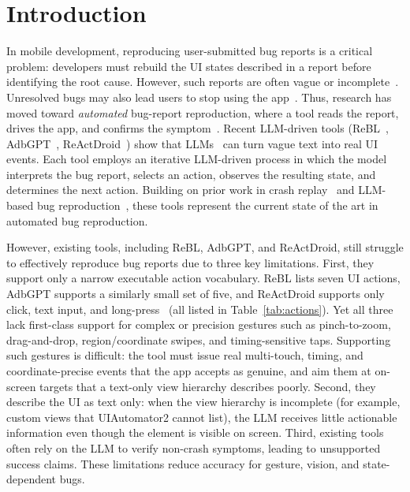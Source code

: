 \documentclass[10pt,conference,a4paper]{IEEEtran}
\begin{document}
  \section{Introduction}
  \label{sec:intro}

  In mobile development, reproducing user-submitted bug reports is a
  critical problem: developers must rebuild the UI states described in a
  report before identifying the root cause. However, such reports are
  often vague or incomplete~\cite{zimmermann,chaparro-s2r,rebl,adbgpt}.
  Unresolved bugs may also lead users to stop using the app~\cite{applause}.
  Thus, research has moved toward \emph{automated} bug-report
  reproduction, where a tool reads the report, drives the app, and
  confirms the symptom~\cite{recdroid,recdroidplus}. Recent LLM-driven tools (ReBL~\cite{rebl}, AdbGPT~\cite{adbgpt},
  ReActDroid~\cite{reactdroid}) show that LLMs~\cite{gpt4,gemini} can turn
  vague text into real UI events.
  Each tool employs an iterative LLM-driven process in which the model
  interprets the bug report, selects an action, observes the resulting
  state, and determines the next action. Building on prior work in
  crash replay~\cite{recdroid,recdroidplus,yakusu,crashtranslator,scopedroid}
  and LLM-based bug reproduction~\cite{libro}, these tools represent the
  current state of the art in automated bug reproduction. 

  However, existing tools, including ReBL, AdbGPT, and ReActDroid, still struggle to effectively reproduce bug reports due to three key limitations. First, they support only a narrow executable action vocabulary. ReBL lists seven
  UI actions, AdbGPT supports a similarly small set of five, and
  ReActDroid supports only click, text input, and long-press~\cite{rebl,adbgpt,reactdroid}
  (all listed in Table~\ref{tab:actions}). Yet all three lack first-class support for complex or precision gestures such as pinch-to-zoom, drag-and-drop,
  region/coordinate swipes, and timing-sensitive taps. Supporting such gestures is difficult: the tool must issue real multi-touch, timing, and coordinate-precise events that the app accepts as genuine, and aim them at on-screen targets that a text-only view hierarchy describes poorly. Second,
  they describe the UI as text only: when the
  view hierarchy is incomplete (for example, custom views that UIAutomator2
 cannot list), the LLM receives little actionable information even though
  the element is visible on screen. Third, existing tools often rely on the
  LLM to verify non-crash symptoms, leading to unsupported success claims.
  These limitations reduce accuracy for gesture, vision, and state-dependent
  bugs.
  
\end{document}
